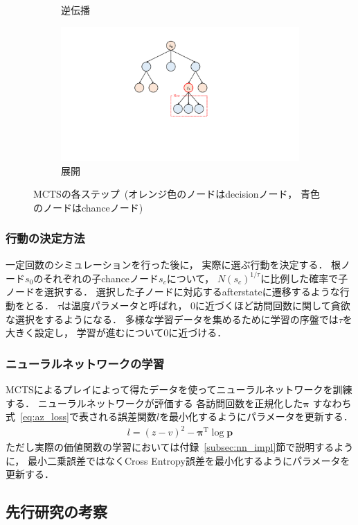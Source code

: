 \begin{figure}
\begin{subfigure}[T]{0.4\columnwidth}
    \caption{逆伝播}
    \label{fig:backpropagate}
  \end{subfigure}
  \hspace{3cm}
  \begin{subfigure}[T]{0.4\columnwidth}
    \centering
    \includegraphics[width=\columnwidth]{figures/expand_.pdf}
    \caption{展開}
    \label{fig:expand}
  \end{subfigure}
  \caption{MCTSの各ステップ~(オレンジ色のノードはdecisionノード， 青色のノードはchanceノード)}
  \label{fig:mcts}
\end{figure}

\subsubsection*{行動の決定方法}
一定回数のシミュレーションを行った後に， 実際に選ぶ行動を決定する．
根ノード$s_0$のそれぞれの子chanceノード$s_c$について， $N(s_c)^{1/\tau}$に比例した確率で子ノードを選択する．
選択した子ノードに対応するafterstateに遷移するような行動をとる．
$\tau$は温度パラメータと呼ばれ， $0$に近づくほど訪問回数に関して貪欲な選択をするようになる．
多様な学習データを集めるために学習の序盤では$\tau$を大きく設定し， 学習が進むについて$0$に近づける．

\subsubsection*{ニューラルネットワークの学習}
MCTSによるプレイによって得たデータを使ってニューラルネットワークを訓練する．
ニューラルネットワークが評価する
各訪問回数を正規化した$\pmb{\pi}$
すなわち式~\ref{eq:az_loss}で表される誤差関数$l$を最小化するようにパラメータを更新する．
\begin{align}
\label{eq:az_loss}
l = (z-v)^2 - \pmb{\pi}^{\mathrm{T}} \log \mathbf{p}
\end{align}
ただし実際の価値関数の学習においては付録~\ref{subsec:nn_impl}節で説明するように， 最小二乗誤差ではなくCross Entropy誤差を最小化するようにパラメータを更新する．


\subsection{先行研究の考察}